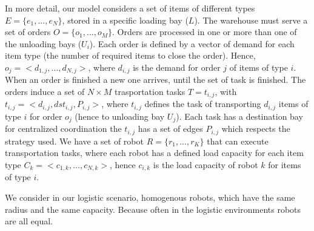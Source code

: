In more detail, our model considers a set of items of different types $E = \{ e_1,...,e_N\}$,
stored in a specific loading bay ($L$). The warehouse must serve a set of orders 
$O=\{o_1,...,o_M\}$. Orders are processed in one or more than one of the unloading bays ($U_i$).
Each order is defined by a vector of demand for each item type (the number of required 
items to close the order). Hence, $o_j = < d_{1,j},...,d_{N,j}>$, where $d_{i,j}$ is the 
demand for order $j$ of items of type $i$. When an order is finished a new one arrives,
until the set of task is finished.
The orders induce a set of $N \times M$ trasportation tasks $T = {t_{i,j}}$, with 
$t_{i,j} = < d_{i,j}, dst_{i,j}, P_{i,j}>$, where $t_{i,j}$ defines the task of transporting 
$d_{i,j}$ items of type $i$ for order $o_j$ (hence to unloading bay $U_j$).
Each task has a destination bay for centralized coordination the $t_{i,j}$ has a set of edges
$P_{i,j}$ which respects the strategy used. 
We have a set of robot $R = \{r_1,...,r_K \}$ that can execute transportation tasks, where
each robot has a defined load capacity for each item type $C_k = <c_{1,k},...,c_{N,k}>$, 
hence $c_{i,k}$ is the load capacity of robot $k$ for items of type $i$.

We consider in our logistic scenario, homogenous robots, which have the same radius 
and the same capacity. Because often in the logistic environments robots are all 
equal. 


